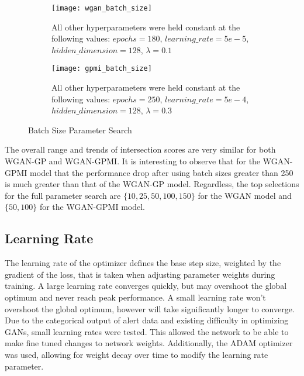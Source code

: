 \begin{figure}[!htbp]
	\centering
	\begin{subfigure}{.7\textwidth}
		\texttt{[image: wgan\_batch\_size]}
	\end{subfigure}%
	\begin{subfigure}{.3\textwidth}
		\caption{
			All other hyperparameters were held constant at the following values: $epochs=180$, $learning\_rate=5e-5$, $hidden\_dimension=128$, $\lambda=0.1$
		}
		\label{fig:wgan_batch_size}
	\end{subfigure}%

	\begin{subfigure}{.7\textwidth}
		\texttt{[image: gpmi\_batch\_size]}
	\end{subfigure}%
	\begin{subfigure}{.3\textwidth}
		\caption{
			All other hyperparameters were held constant at the following values: $epochs=250$, $learning\_rate=5e-4$, $hidden\_dimension=128$, $\lambda=0.3$
		}
		\label{fig:gpmi_batch_size}
	\end{subfigure}%
	\caption{Batch Size Parameter Search}
\end{figure}

The overall range and trends of intersection scores are very similar for both WGAN-GP and WGAN-GPMI. It is interesting to observe that for the WGAN-GPMI model that the performance drop after using batch sizes greater than 250 is much greater than that of the WGAN-GP model. Regardless, the top selections for the full parameter search are $\{10,25,50,100,150\}$ for the WGAN model and $\{50,100\}$ for the WGAN-GPMI model.

\subsection{Learning Rate}
\label{sec:lr}

The learning rate of the optimizer defines the base step size, weighted by the gradient of the loss, that is taken when adjusting parameter weights during training. A large learning rate converges quickly, but may overshoot the global optimum and never reach peak performance. A small learning rate won't overshoot the global optimum, however will take significantly longer to converge. Due to the categorical output of alert data and existing difficulty in optimizing GANs, small learning rates were tested. This allowed the network to be able to make fine tuned changes to network weights. Additionally, the ADAM optimizer was used, allowing for weight decay over time to modify the learning rate parameter. 


